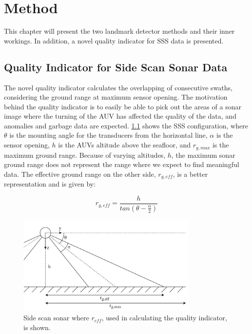 \chapter{Method}

This chapter will present the two landmark detector methods and their inner workings. In addition, a novel quality indicator for SSS data is presented.

\section{Quality Indicator for Side Scan Sonar Data}

The novel quality indicator calculates the overlapping of consecutive swaths, considering the ground range at maximum sensor opening. The motivation behind the quality indicator is to easily be able to pick out the areas of a sonar image where the turning of the AUV has affected the quality of the data, and anomalies and garbage data are expected. \cref{fig:r_eff} shows the SSS configuration, where $\theta$ is the mounting angle for the transducers from the horizontal line, $\alpha$ is the sensor opening, $h$ is the AUVs altitude above the seafloor, and $r_{g, max}$ is the maximum ground range. Because of varying altitudes, $h$, the maximum sonar ground range does not represent the range where we expect to find meaningful data. The effective ground range on the other side, $r_{g, eff}$, is a better representation and is given by:

\begin{equation}
    r_{g,eff} = \frac{h}{tan(\theta - \frac{\alpha}{2})}
    \label{eq:r_g_eff}
\end{equation}

\begin{figure}
    \centering
    \includegraphics[width=0.8\textwidth]{figures/r_eff.drawio.pdf}
    \caption{Side scan sonar where $r_{eff}$, used in calculating the quality indicator, is shown.}
    \label{fig:r_eff}
\end{figure}

